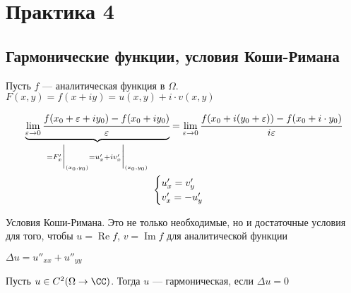 \section{Практика 4}
\subsection{Гармонические функции, условия Коши-Римана}

Пусть $f$ --- аналитическая функция в $\Omega$. $F(x, y) = f(x + iy) = u (x, y) + i \cdot v(x, y)$

\begin{gather*}
    \underbrace{\lim\limits_{\varepsilon \to 0} \cfrac{f(x_0 + \varepsilon + iy_0) - f(x_0 + iy_0)}{\varepsilon}}_{=F'_x\bigg|_{(x_0, y_0)} = u'_x + iv'_x\bigg|_{(x_0, y_0)}} = \lim\limits_{\varepsilon \to 0} \cfrac{f(x_0 + i(y_0 + \varepsilon)) - f(x_0 + i \cdot y_0)}{i\varepsilon} \\ 
    \begin{cases}
        u'_x = v'_y \\ 
        v'_x = -u'_y
    \end{cases}
\end{gather*}

Условия Коши-Римана. Это не только необходимые, но и достаточные условия для того, чтобы $u = \operatorname{Re} f$, $v = \operatorname{Im} f$ для аналитической функции

\begin{df}
    $\Delta u = u''_{xx} + u''_{yy}$
\end{df}
\begin{df}
    Пусть $u \in C^2(\Omega \to \CC)$. Тогда $u$ --- гармоническая, если $\Delta u = 0$
\end{df}

